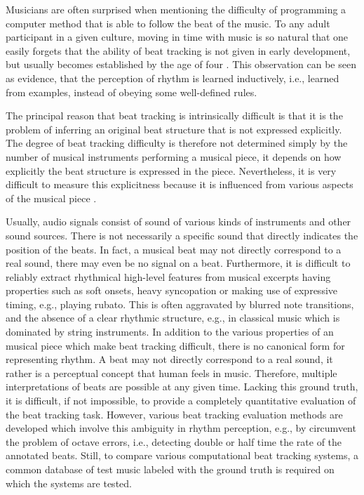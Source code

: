 \documentclass{scrartcl}
\begin{document}
Musicians are often surprised when mentioning the difficulty of programming a computer method that is able to follow the beat of the music. To any adult participant in a given culture, moving in time with music is so natural that one easily forgets that the ability of beat tracking is not given in early development, but usually becomes established by the age of four \cite{Drake2000}. This observation can be seen as evidence, that the perception of rhythm is learned inductively, i.e., learned from examples, instead of obeying some well-defined rules.

The principal reason that beat tracking is intrinsically difficult is that it is the problem of inferring an original beat structure that is not expressed explicitly. The degree of beat tracking difficulty is therefore not determined simply by the number of musical instruments performing a musical piece, it depends on how explicitly the beat structure is expressed in the piece. Nevertheless, it is very difficult to measure this explicitness because it is influenced from various aspects of the musical piece \cite{Quinton2016}.

Usually, audio signals consist of sound of various kinds of instruments and other sound sources. There is not necessarily a specific sound that directly indicates the position of the beats. In fact, a musical beat may not directly correspond to a real sound, there may even be no signal on a beat. Furthermore, it is difficult to reliably extract rhythmical high-level features from musical excerpts having properties such as soft onsets, heavy syncopation or making use of expressive timing, e.g., playing rubato. This is often aggravated by blurred note transitions, and the absence of a clear rhythmic structure, e.g., in classical music which is dominated by string instruments. In addition to the various properties of an musical piece which make beat tracking difficult, there is no canonical form for representing rhythm. A beat may not directly correspond to a real sound, it rather is a perceptual concept that human feels in music. Therefore, multiple interpretations of beats are possible at any given time. Lacking this ground truth, it is difficult, if not impossible, to provide a completely quantitative evaluation of the beat tracking task. However, various beat tracking evaluation methods are developed which involve this ambiguity in rhythm perception, e.g., by circumvent the problem of octave errors, i.e., detecting double or half time the rate of the annotated beats. Still, to compare various computational beat tracking systems, a common database of test music labeled with the ground truth is required on which the systems are tested. 
\end{document}
